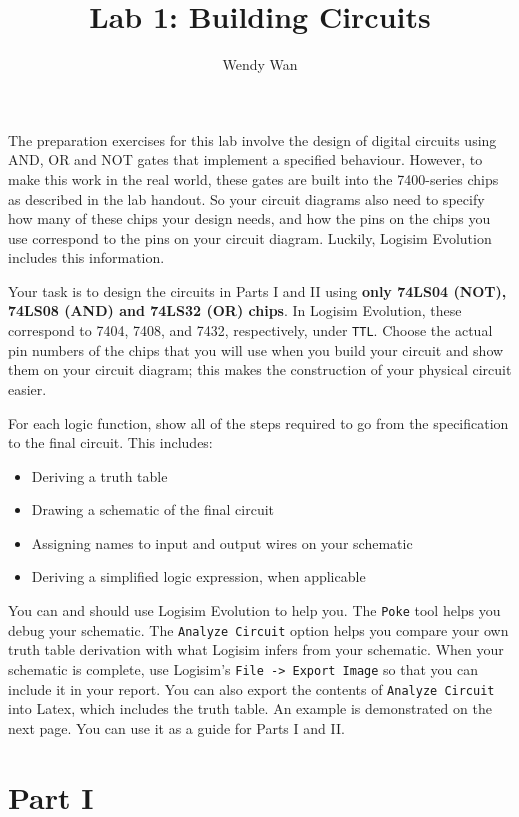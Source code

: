 \documentclass{article}
\title{Lab 1: Building Circuits}
\author{Wendy Wan}
\begin{document}
\maketitle

The preparation exercises for this lab involve the design of digital circuits using AND, OR and NOT gates that implement a specified behaviour.
However, to make this work in the real world, these gates are built into the 7400-series chips as described in the lab handout.
So your circuit diagrams also need to specify how many of these chips your design needs, and how the pins on the chips you use correspond to the pins on your circuit diagram.
Luckily, Logisim Evolution includes this information.

Your task is to design the circuits in Parts I and II using \textbf{only 74LS04 (NOT), 74LS08 (AND) and 74LS32 (OR) chips}.
In Logisim Evolution, these correspond to 7404, 7408, and 7432, respectively, under \verb|TTL|.
Choose the actual pin numbers of the chips that you will use when you build your circuit and show them on your circuit diagram;
this makes the construction of your physical circuit easier.

For each logic function, show all of the steps required to go from the specification to the final circuit.
This includes:

\begin{itemize}
\item Deriving a truth table
\item Drawing a schematic of the final circuit
\item Assigning names to input and output wires on your schematic
\item Deriving a simplified logic expression, when applicable
\end{itemize}

You can and should use Logisim Evolution to help you.
The \verb|Poke| tool helps you debug your schematic.
The \verb|Analyze Circuit| option helps you compare your own truth table derivation with what Logisim infers from your schematic.
When your schematic is complete, use Logisim's \verb|File -> Export Image| so that you can include it in your report.
You can also export the contents of \verb|Analyze Circuit| into Latex, which includes the truth table.
An example is demonstrated on the next page.
You can use it as a guide for Parts I and II.

\newpage
\section*{Part I}
\end{document}
